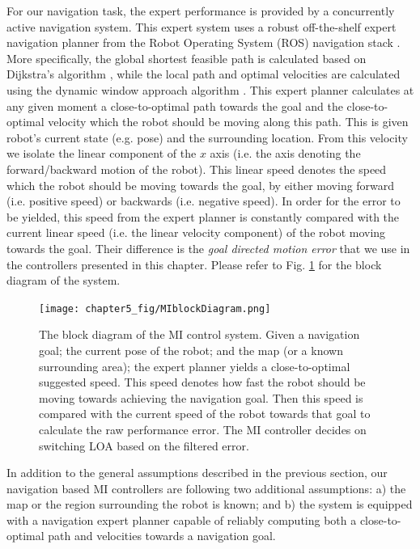 \documentclass[a4paper,12pt,oneside,openright]{bhamthesis}
\begin{document}
For our navigation task, the expert performance is provided by a concurrently active navigation system. This expert system uses a robust off-the-shelf expert navigation planner from the Robot Operating System (ROS) navigation stack \citep{Marder-Eppstein2010}. More specifically, the global shortest feasible path is calculated based on Dijkstra's algorithm \citep{Dijkstra1959}, while the local path and optimal velocities are calculated using the dynamic window approach algorithm \citep{dwa_planner}. This expert planner calculates at any given moment a close-to-optimal path towards the goal and the close-to-optimal velocity which the robot should be moving along this path. This is given robot's current state (e.g. pose) and the surrounding location. From this velocity we isolate the linear component of the $x$ axis (i.e. the axis denoting the forward/backward motion of the robot). This linear speed denotes the speed which the robot should be moving towards the goal, by either moving forward (i.e. positive speed) or backwards (i.e. negative speed). In order for the error to be yielded, this speed from the expert planner is constantly compared with the current linear speed (i.e. the linear velocity component) of the robot moving towards the goal. Their difference is the \textit{goal directed motion error} that we use in the controllers presented in this chapter. Please refer to Fig. \ref{fig:block_diagram} for the block diagram of the system.

\begin{figure}
	\centering
	\texttt{[image: chapter5\_fig/MIblockDiagram.png]}
	\caption{The block diagram of the MI control system. Given a navigation goal; the current pose of the robot; and the map (or a known surrounding area); the expert planner yields a close-to-optimal suggested speed. This speed denotes how fast the robot should be moving towards achieving the navigation goal. Then this speed is compared with the current speed of the robot towards that goal to calculate the raw performance error. The MI controller decides on switching LOA based on the filtered error.} 
	\label{fig:block_diagram}
\end{figure}

In addition to the general assumptions described in the previous section, our navigation based MI controllers are following two additional assumptions: a) the map or the region surrounding the robot is known; and b) the system is equipped with a navigation expert planner capable of reliably computing both a close-to-optimal path and velocities towards a navigation goal.
 
\end{document}
